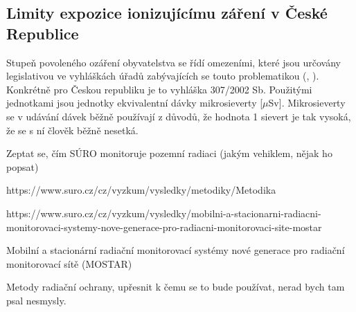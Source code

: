 \subsection{Limity expozice ionizujícímu záření v České Republice}
Stupeň povoleného ozáření obyvatelstva se řídí omezeními, které jsou určovány legislativou ve vyhláškách úřadů zabývajících se touto problematikou (, ). Konkrétně pro Českou republiku je to vyhláška  307/2002 Sb. Použitými jednotkami jsou jednotky ekvivalentní dávky mikrosieverty [$\mu$Sv]. Mikrosieverty se v udávání dávek běžně používají z důvodů, že hodnota 1 sievert je tak vysoká, že se s ní člověk běžně nesetká.  









Zeptat se, čím SÚRO monitoruje pozemní radiaci (jakým vehiklem, nějak ho popsat)

https://www.suro.cz/cz/vyzkum/vysledky/metodiky/Metodika%

https://www.suro.cz/cz/vyzkum/vysledky/mobilni-a-stacionarni-radiacni-monitorovaci-systemy-nove-generace-pro-radiacni-monitorovaci-site-mostar

Mobilní a stacionární radiační monitorovací systémy nové generace pro radiační monitorovací sítě (MOSTAR)

Metody radiační ochrany, upřesnit k čemu se to bude používat, nerad bych tam psal nesmysly.